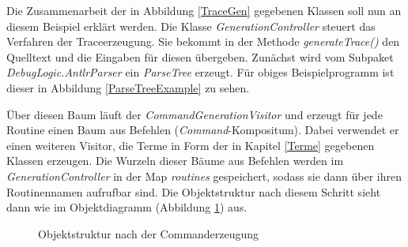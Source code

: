 \documentclass[parskip=full]{scrartcl}
\begin{document}
Die Zusammenarbeit der in Abbildung \ref{TraceGen} gegebenen Klassen soll nun an diesem Beispiel erklärt werden. 
Die Klasse \textit{GenerationController} steuert das Verfahren der Traceerzeugung. 
Sie bekommt in der Methode \textit{generateTrace()} den Quelltext und die Eingaben für diesen übergeben. 
Zunächst wird vom Subpaket \textit{DebugLogic.AntlrParser} ein \textit{ParseTree} erzeugt. 
Für obiges Beispielprogramm ist dieser in Abbildung \ref{ParseTreeExample} zu sehen.
\begin{center}
\label{ParseTreeExample}
\end{center}
Über diesen Baum läuft der \textit{CommandGenerationVisitor} und erzeugt für jede Routine einen Baum aus Befehlen (\textit{Command}-Kompositum). 
Dabei verwendet er einen weiteren Visitor, die Terme in Form der in Kapitel \ref{Terme} gegebenen Klassen erzeugen. 
Die Wurzeln dieser Bäume aus Befehlen werden im \textit{GenerationController} in der Map \textit{routines} gespeichert, sodass sie dann über ihren Routinennamen aufrufbar sind. 
Die Objektstruktur nach diesem Schritt sieht dann wie im Objektdiagramm (Abbildung \ref{CommandTreeExample}) aus.
\begin{figure}[!h]
\caption{Objektstruktur nach der Commanderzeugung}
\label{CommandTreeExample}
\end{figure}
\end{document}
